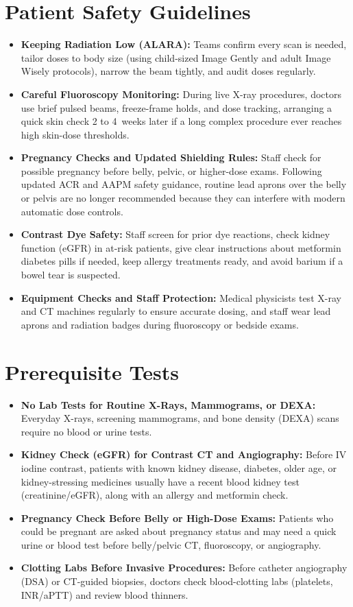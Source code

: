 \section{Patient Safety Guidelines}
\begin{itemize}
  \item \textbf{Keeping Radiation Low (ALARA):} Teams confirm every scan is needed, tailor doses to body size (using child-sized Image Gently and adult Image Wisely protocols), narrow the beam tightly, and audit doses regularly.
  \item \textbf{Careful Fluoroscopy Monitoring:} During live X-ray procedures, doctors use brief pulsed beams, freeze-frame holds, and dose tracking, arranging a quick skin check 2 to 4~weeks later if a long complex procedure ever reaches high skin-dose thresholds.
  \item \textbf{Pregnancy Checks and Updated Shielding Rules:} Staff check for possible pregnancy before belly, pelvic, or higher-dose exams. Following updated ACR and AAPM safety guidance, routine lead aprons over the belly or pelvis are no longer recommended because they can interfere with modern automatic dose controls.
  \item \textbf{Contrast Dye Safety:} Staff screen for prior dye reactions, check kidney function (eGFR) in at-risk patients, give clear instructions about metformin diabetes pills if needed, keep allergy treatments ready, and avoid barium if a bowel tear is suspected.
  \item \textbf{Equipment Checks and Staff Protection:} Medical physicists test X-ray and CT machines regularly to ensure accurate dosing, and staff wear lead aprons and radiation badges during fluoroscopy or bedside exams.
\end{itemize}

\section{Prerequisite Tests}
\begin{itemize}
  \item \textbf{No Lab Tests for Routine X-Rays, Mammograms, or DEXA:} Everyday X-rays, screening mammograms, and bone density (DEXA) scans require no blood or urine tests.
  \item \textbf{Kidney Check (eGFR) for Contrast CT and Angiography:} Before IV iodine contrast, patients with known kidney disease, diabetes, older age, or kidney-stressing medicines usually have a recent blood kidney test (creatinine/eGFR), along with an allergy and metformin check.
  \item \textbf{Pregnancy Check Before Belly or High-Dose Exams:} Patients who could be pregnant are asked about pregnancy status and may need a quick urine or blood test before belly/pelvic CT, fluoroscopy, or angiography.
  \item \textbf{Clotting Labs Before Invasive Procedures:} Before catheter angiography (DSA) or CT-guided biopsies, doctors check blood-clotting labs (platelets, INR/aPTT) and review blood thinners.
\end{itemize}

